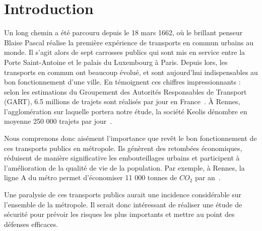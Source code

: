\section{Introduction}
	Un long chemin a été parcouru depuis le 18 mars 1662, où le brillant penseur Blaise Pascal réalise la première expérience de transports en commun urbains au monde. Il s'agit alors de sept carrosses publics qui sont mis en service entre la Porte Saint-Antoine et le palais du Luxembourg à Paris. Depuis lors, les transports en commun ont beaucoup évolué, et sont aujourd'hui indispensables au bon fonctionnement d'une ville. En témoignent ces chiffres impressionnants : selon les estimations du Groupement des Autorités Responsables de Transport (GART), 6.5 millions de trajets sont réalisés par jour en France~\cite{Gart}. \`A Rennes, l'agglomération sur laquelle portera notre étude, la société Keolis dénombre en moyenne 250 000 trajets par jour~\cite{Keolis}. 

	Nous comprenons donc aisément l'importance que revêt le bon fonctionnement de ces transports publics en métropole. Ils génèrent des retombées économiques, réduisent de manière significative les embouteillages urbains et participent à l’amélioration de la qualité de vie de la population. Par exemple, à Rennes, la ligne A du métro permet d'économiser 11 000 tonnes de $CO_2$ par an~\cite{bilanLA}. 

	Une paralysie de ces transports publics aurait une incidence considérable sur l'ensemble de la métropole. Il serait donc intéressant de réaliser une étude de sécurité pour prévoir les risques les plus importants et mettre au point des défenses efficaces. 

























